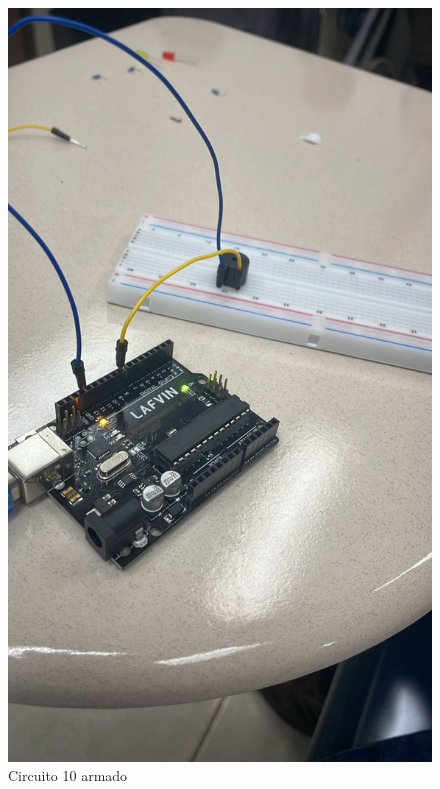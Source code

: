 \begin{figure}[H]
  \centering
  \includegraphics[scale = 0.3]{Imagenes/circDesarrollados/cd_10_circuito-ejecucion.jpg}
  \caption{Circuito 10 armado}
\end{figure}

